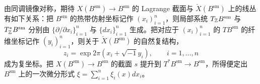 由同调镜像对称，期待 $X(B^{\mathrm{sm}})\to B^{\mathrm{sm}}$ 的 Lagrange 截面与 $\check X(B^{\mathrm{sm}})$ 上的线丛有如下关系：把 $B^{\mathrm{sm}}$ 的热带仿射坐标记作 $(x_i)_{i=1}^{n}$，则局部系统 $T_{\mathbb{Z}}B^{\mathrm{sm}}$ 与 $T^*_{\mathbb{Z}}B^{\mathrm{sm}}$ 分别由 $\{\partial/\partial x_i\}_{i=1}^{n}$ 与 $\{dx_i\}_{i=1}^{n}$ 生成。把对应于 $(x_i)_{i=1}^{n}$ 的 $TB^{\mathrm{sm}}$ 的纤维坐标记作 $(y_i)_{i=1}^{n}$，则关于 $\check X(B^{\mathrm{sm}})$ 的自然复结构，
\begin{equation}
z_i=\exp 2\pi\left(x_i+\sqrt{-1}y_i\right),\qquad i=1,\dots,n
\tag{14}
\end{equation}
\noindent 成为复坐标。把 $X(B^{\mathrm{sm}})\to B^{\mathrm{sm}}$ 的截面 $s$ 提升到 $T^*B^{\mathrm{sm}}\to B^{\mathrm{sm}}$，所得便定出 $B^{\mathrm{sm}}$ 上的一次微分形式 $\xi=\sum_{i=1}^{n}\xi_i(x)dx_i$。


